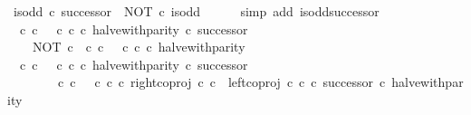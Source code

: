 \begin{isabellebody}
\ {\isachardoublequoteopen}is{\isacharunderscore}{\kern0pt}odd\ {\isasymcirc}\isactrlsub c\ successor\ {\isacharequal}{\kern0pt}\ NOT\ {\isasymcirc}\isactrlsub c\ is{\isacharunderscore}{\kern0pt}odd{\isachardoublequoteclose}\isanewline
\ \ \ \ \isamarkupfalse%
\ {\isacharparenleft}{\kern0pt}simp\ add{\isacharcolon}{\kern0pt}\ is{\isacharunderscore}{\kern0pt}odd{\isacharunderscore}{\kern0pt}successor{\isacharparenright}{\kern0pt}\isanewline
\isanewline
\ \ \isamarkupfalse%
\ {\isachardoublequoteopen}{\isacharparenleft}{\kern0pt}{\isacharparenleft}{\kern0pt}{\isasymf}\ {\isasymcirc}\isactrlsub c\ {\isasymbeta}\isactrlbsub {\isasymnat}\isactrlsub c\isactrlesub {\isacharparenright}{\kern0pt}\ {\isasymamalg}\ {\isacharparenleft}{\kern0pt}{\isasymt}\ {\isasymcirc}\isactrlsub c\ {\isasymbeta}\isactrlbsub {\isasymnat}\isactrlsub c\isactrlesub {\isacharparenright}{\kern0pt}\ {\isasymcirc}\isactrlsub c\ halve{\isacharunderscore}{\kern0pt}with{\isacharunderscore}{\kern0pt}parity{\isacharparenright}{\kern0pt}\ {\isasymcirc}\isactrlsub c\ successor\ {\isacharequal}{\kern0pt}\isanewline
\ \ \ \ NOT\ {\isasymcirc}\isactrlsub c\ {\isacharparenleft}{\kern0pt}{\isasymf}\ {\isasymcirc}\isactrlsub c\ {\isasymbeta}\isactrlbsub {\isasymnat}\isactrlsub c\isactrlesub {\isacharparenright}{\kern0pt}\ {\isasymamalg}\ {\isacharparenleft}{\kern0pt}{\isasymt}\ {\isasymcirc}\isactrlsub c\ {\isasymbeta}\isactrlbsub {\isasymnat}\isactrlsub c\isactrlesub {\isacharparenright}{\kern0pt}\ {\isasymcirc}\isactrlsub c\ halve{\isacharunderscore}{\kern0pt}with{\isacharunderscore}{\kern0pt}parity{\isachardoublequoteclose}\isanewline
\ \ \isamarkupfalse%
\ {\isacharminus}{\kern0pt}\isanewline
\ \ \ \ \isamarkupfalse%
\ {\isachardoublequoteopen}{\isacharparenleft}{\kern0pt}{\isacharparenleft}{\kern0pt}{\isasymf}\ {\isasymcirc}\isactrlsub c\ {\isasymbeta}\isactrlbsub {\isasymnat}\isactrlsub c\isactrlesub {\isacharparenright}{\kern0pt}\ {\isasymamalg}\ {\isacharparenleft}{\kern0pt}{\isasymt}\ {\isasymcirc}\isactrlsub c\ {\isasymbeta}\isactrlbsub {\isasymnat}\isactrlsub c\isactrlesub {\isacharparenright}{\kern0pt}\ {\isasymcirc}\isactrlsub c\ halve{\isacharunderscore}{\kern0pt}with{\isacharunderscore}{\kern0pt}parity{\isacharparenright}{\kern0pt}\ {\isasymcirc}\isactrlsub c\ successor\isanewline
\ \ \ \ \ \ {\isacharequal}{\kern0pt}\ {\isacharparenleft}{\kern0pt}{\isasymf}\ {\isasymcirc}\isactrlsub c\ {\isasymbeta}\isactrlbsub {\isasymnat}\isactrlsub c\isactrlesub {\isacharparenright}{\kern0pt}\ {\isasymamalg}\ {\isacharparenleft}{\kern0pt}{\isasymt}\ {\isasymcirc}\isactrlsub c\ {\isasymbeta}\isactrlbsub {\isasymnat}\isactrlsub c\isactrlesub {\isacharparenright}{\kern0pt}\ {\isasymcirc}\isactrlsub c\ {\isacharparenleft}{\kern0pt}right{\isacharunderscore}{\kern0pt}coproj\ {\isasymnat}\isactrlsub c\ {\isasymnat}\isactrlsub c\ {\isasymamalg}\ {\isacharparenleft}{\kern0pt}left{\isacharunderscore}{\kern0pt}coproj\ {\isasymnat}\isactrlsub c\ {\isasymnat}\isactrlsub c\ {\isasymcirc}\isactrlsub c\ successor{\isacharparenright}{\kern0pt}{\isacharparenright}{\kern0pt}\ {\isasymcirc}\isactrlsub c\ halve{\isacharunderscore}{\kern0pt}with{\isacharunderscore}{\kern0pt}parity{\isachardoublequoteclose}\isanewline

\end{isabellebody}
